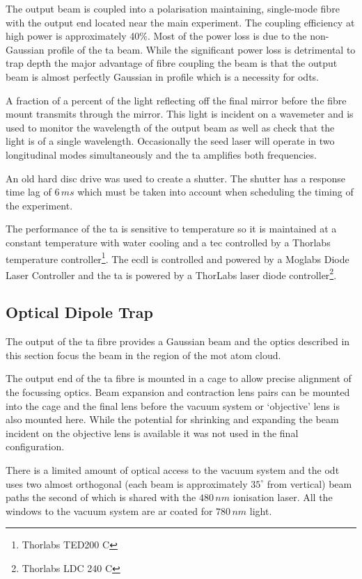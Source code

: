 The output beam is coupled into a polarisation maintaining, single-mode fibre with the output end located near the main experiment. The coupling efficiency at high power is approximately 40\%. Most of the power loss is due to the non-Gaussian profile of the \gls{ta} beam. While the significant power loss is detrimental to trap depth the major advantage of fibre coupling the beam is that the output beam is almost perfectly Gaussian in profile which is a necessity for \glspl{odt}.

A fraction of a percent of the light reflecting off the final mirror before the fibre mount transmits through the mirror. This light is incident on a wavemeter and is used to monitor the wavelength of the output beam as well as check that the light is of a single wavelength. Occasionally the seed laser will operate in two longitudinal modes simultaneously and the \gls{ta} amplifies both frequencies.

An old hard disc drive was used to create a shutter\cite{scholten_enhanced_2007}. The shutter has a response time lag of $6\,\unit{ms}$ which must be taken into account when scheduling the timing of the experiment.

The performance of the \gls{ta} is sensitive to temperature so it is maintained at a constant temperature with water cooling and a \gls{tec} controlled by a Thorlabs temperature controller\footnote{Thorlabs TED200 C}. The \gls{ecdl} is controlled and powered by a Moglabs Diode Laser Controller and the \gls{ta} is powered by a ThorLabs laser diode controller\footnote{Thorlabs LDC 240 C}.

\subsection{Optical Dipole Trap}

The output of the \gls{ta} fibre provides a Gaussian beam and the optics described in this section focus the beam in the region of the \gls{mot} atom cloud.

The output end of the \gls{ta} fibre is mounted in a cage to allow precise alignment of the focussing optics. Beam expansion and contraction lens pairs can be mounted into the cage and the final lens before the vacuum system or `objective' lens is also mounted here. While the potential for shrinking and expanding the beam incident on the objective lens is available it was not used in the final configuration.

There is a limited amount of optical access to the vacuum system and the \gls{odt} uses two almost orthogonal (each beam is approximately $35^{\circ}$ from vertical) beam paths the second of which is shared with the $480\,\unit{nm}$ ionisation laser. All the windows to the vacuum system are \gls{ar} coated for $780\,\unit{nm}$ light.

